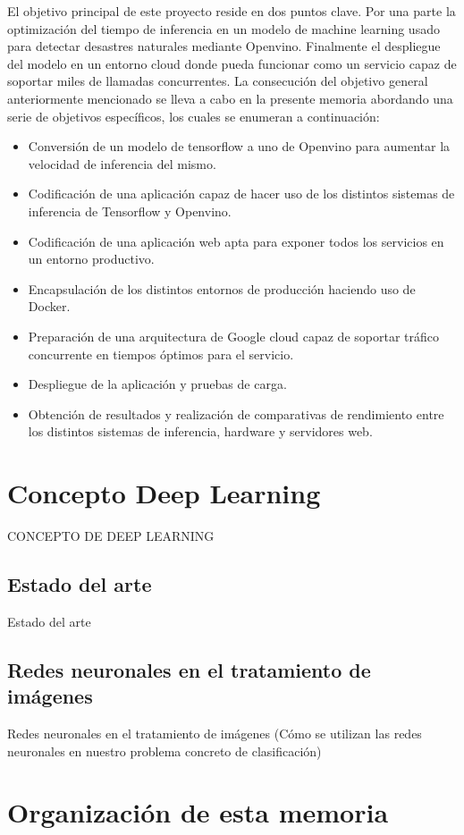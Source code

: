 El objetivo principal de este proyecto reside en dos puntos clave.
Por una parte la optimización del tiempo de inferencia en un modelo de machine learning usado para detectar desastres naturales mediante Openvino.
Finalmente el despliegue del modelo en un entorno cloud donde pueda funcionar como un servicio capaz de soportar miles de llamadas concurrentes.
La consecución del objetivo general anteriormente mencionado se lleva a cabo en la
presente memoria abordando una serie de objetivos específicos, los cuales se enumeran a
continuación:
\begin{itemize}
    \item Conversión de un modelo de tensorflow a uno de Openvino para aumentar la velocidad de inferencia del mismo.
    \item Codificación de una aplicación capaz de hacer uso de los distintos sistemas de inferencia de Tensorflow y Openvino.
    \item Codificación de una aplicación web apta para exponer todos los servicios en un entorno productivo.
    \item Encapsulación de los distintos entornos de producción haciendo uso de Docker.
    \item Preparación de una arquitectura de Google cloud capaz de soportar tráfico concurrente en tiempos óptimos para el servicio.
    \item Despliegue de la aplicación y pruebas de carga.
    \item Obtención de resultados y realización de comparativas de rendimiento entre los distintos sistemas de inferencia, hardware y servidores web.
\end{itemize}

\section{Concepto Deep Learning}
CONCEPTO DE DEEP LEARNING
\subsection{Estado del arte}
Estado del arte
\subsection{Redes neuronales en el tratamiento de imágenes}
Redes neuronales en el tratamiento de imágenes
(Cómo se utilizan las redes neuronales en nuestro problema concreto de clasificación)
\section{Organización de esta memoria}

